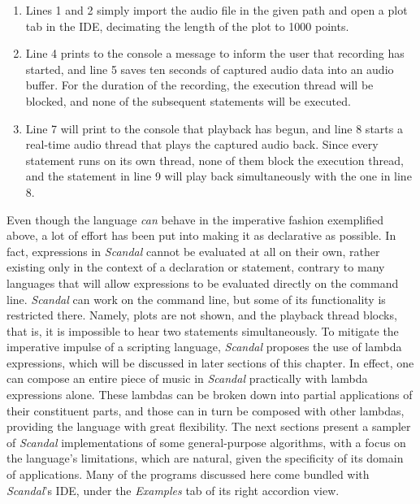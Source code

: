\begin{enumerate}
	\item Lines 1 and 2 simply import the audio file in the given path and open a plot tab in the IDE, decimating the length of the plot to 1000 points.
	\addtocounter{enumi}{2}
	\item Line 4 prints to the console a message to inform the user that recording has started, and line 5 saves ten seconds of captured audio data into an audio buffer. For the duration of the recording, the execution thread will be blocked, and none of the subsequent statements will be executed.
	\addtocounter{enumi}{2}
	\item Line 7 will print to the console that playback has begun, and line 8 starts a real-time audio thread that plays the captured audio back. Since every  statement runs on its own thread, none of them block the execution thread, and the statement in line 9 will play back simultaneously with the one in line 8.
\end{enumerate}

Even though the language \emph{can} behave in the imperative fashion exemplified above, a lot of effort has been put into making it as declarative as possible. In fact, expressions in \emph{Scandal} cannot be evaluated at all on their own, rather existing only in the context of a declaration or statement, contrary to many languages that will allow expressions to be evaluated directly on the command line. \emph{Scandal} can work on the command line, but some of its functionality is restricted there. Namely, plots are not shown, and the playback thread blocks, that is, it is impossible to hear two  statements simultaneously. To mitigate the imperative impulse of a scripting language, \emph{Scandal} proposes the use of lambda expressions, which will be discussed in later sections of this chapter. In effect, one can compose an entire piece of music in \emph{Scandal} practically with lambda expressions alone. These lambdas can be broken down into partial applications of their constituent parts, and those can in turn be composed with other lambdas, providing the language with great flexibility. The next sections present a sampler of \emph{Scandal} implementations of some general-purpose algorithms, with a focus on the language's limitations, which are natural, given the specificity of its domain of applications. Many of the programs discussed here come bundled with \emph{Scandal}'s IDE, under the \emph{Examples} tab of its right accordion view.

